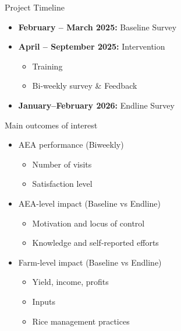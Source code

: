 \documentclass[aspectratio=169]{beamer}
\begin{document}
\begin{frame}{Project Timeline}
	\begin{itemize}
		\item \textbf{February -- March 2025:} Baseline Survey
		\vspace{0.3cm}
		
		\item \textbf{April -- September 2025:} Intervention
		\begin{itemize}
			\item Training
			\item Bi-weekly survey \& Feedback
		\end{itemize}
		\vspace{0.3cm}
		
		\item \textbf{January--February 2026:} Endline Survey 
	\end{itemize}
\end{frame}

\begin{frame}{Main outcomes of interest}
	\begin{itemize}
		\item AEA performance (Biweekly) 
		\begin{itemize}
			\item Number of visits
			\item Satisfaction level 
		\end{itemize}

		\item AEA-level impact (Baseline vs Endline)
		\begin{itemize}
			\item Motivation and locus of control 
			\item Knowledge and self-reported efforts 
		\end{itemize}


		\item Farm-level impact  (Baseline vs Endline)
        \begin{itemize}
			\item Yield, income, profits
			\item Inputs
			\item Rice management practices
			\vspace{0.3cm}
		\end{itemize}		
	\end{itemize}
\end{frame}
\end{document}
